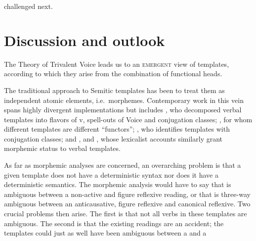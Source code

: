 \begin{exe}
\begin{xlist}
\begin{xlist}
\begin{exe}
\begin{xlist}
\begin{xlist}
\begin{exe}
\begin{xlist}
\begin{xlist}
\begin{exe}
\begin{exe}
\begin{xlist}
\begin{exe}
\begin{exe}
\begin{xlist}
\begin{exe}
\begin{exe}
\begin{exe}
\begin{exe}
\begin{exe}
\begin{xlist}
\begin{exe}
\begin{xlist}
\begin{exe}
\begin{exe}
\begin{xlist}
\begin{exe}
\begin{xlist}
\begin{exe}
\begin{exe}
\begin{exe}
\begin{xlist}
\begin{exe}
\begin{exe}
\begin{exe}
\begin{xlist}
\begin{exe}
\begin{xlist}
\begin{exe}
\begin{xlist}
\begin{exe}
\begin{xlist}
\begin{exe}
\begin{exe}
\begin{exe}
\begin{exe}
\begin{xlist}
\begin{exe}
\begin{xlist}
\begin{exe}
\begin{xlist}
\begin{exe}
\begin{xlist}
\begin{exe}
\begin{xlist}
\begin{exe}
\begin{xlist}
\begin{exe}
\begin{exe}
\begin{exe}
\begin{exe}
\begin{xlist}
\begin{exe}
\begin{xlist}
\begin{exe}
\begin{xlist}
\begin{exe}
\begin{exe}
\begin{xlist}
\begin{exe}
\begin{exe}
\begin{exe}
\begin{exe}
\begin{xlist}
\begin{xlist}
\begin{exe}
\begin{xlist}
\begin{exe}
\begin{exe}
\begin{exe}
\begin{xlist}
\begin{exe}
\begin{exe}
\begin{xlist}
\begin{exe}
\begin{exe}
\begin{exe}
\begin{xlist}
\begin{xlist}
\begin{exe}
\begin{xlist}
\begin{exe}
\begin{exe}
\begin{exe}
\begin{exe}
\begin{xlist}
\begin{exe}
\begin{xlist}
\begin{exe}
\begin{xlist}
\begin{exe}
\begin{exe}
\begin{exe}
\begin{exe}
\begin{exe}
\begin{exe}
\begin{xlist}
\begin{exe}
\begin{xlist}
\begin{exe}
\begin{xlist}
challenged next.


\section{Discussion and outlook} \label{vz:others}
The Theory of Trivalent Voice leads us to an \textsc{emergent} view of templates, according to which they arise from the combination of functional heads.

The traditional approach to Semitic templates has been to treat them as independent atomic elements, i.e.~morphemes. Contemporary work in this vein spans highly divergent implementations but includes \cite{arad03,arad05}, who decomposed verbal templates into flavors of v, spell-outs of Voice and conjugation classes; \cite{borer13oup}, for whom different templates are different ``functors''; \cite{aronoff94,aronoff07}, who identifies templates with conjugation classes; and \cite{reinhartsiloni05}, \cite{schwarzwald08} and \cite{laks11,laks14}, whose lexicalist accounts similarly grant morphemic status to verbal templates.

As far as morphemic analyses are concerned, an overarching problem is that a given template does not have a deterministic syntax nor does it have a deterministic semantics. The morphemic analysis would have to say that {\tnif} is ambiguous between a non-active and figure reflexive reading, or that {\thit} is three-way ambiguous between an anticausative, figure reflexive and canonical reflexive. Two crucial problems then arise. The first is that not all verbs in these templates are ambiguous. The second is that the existing readings are an accident; the templates could just as well have been ambiguous between a  and a 
\end{xlist}
\end{exe}
\end{xlist}
\end{exe}
\end{xlist}
\end{exe}
\end{exe}
\end{exe}
\end{exe}
\end{exe}
\end{exe}
\end{xlist}
\end{exe}
\end{xlist}
\end{exe}
\end{xlist}
\end{exe}
\end{exe}
\end{exe}
\end{exe}
\end{xlist}
\end{exe}
\end{xlist}
\end{xlist}
\end{exe}
\end{exe}
\end{exe}
\end{xlist}
\end{exe}
\end{exe}
\end{xlist}
\end{exe}
\end{exe}
\end{exe}
\end{xlist}
\end{exe}
\end{xlist}
\end{xlist}
\end{exe}
\end{exe}
\end{exe}
\end{exe}
\end{xlist}
\end{exe}
\end{exe}
\end{xlist}
\end{exe}
\end{xlist}
\end{exe}
\end{xlist}
\end{exe}
\end{exe}
\end{exe}
\end{exe}
\end{xlist}
\end{exe}
\end{xlist}
\end{exe}
\end{xlist}
\end{exe}
\end{xlist}
\end{exe}
\end{xlist}
\end{exe}
\end{xlist}
\end{exe}
\end{exe}
\end{exe}
\end{exe}
\end{xlist}
\end{exe}
\end{xlist}
\end{exe}
\end{xlist}
\end{exe}
\end{xlist}
\end{exe}
\end{exe}
\end{exe}
\end{xlist}
\end{exe}
\end{exe}
\end{exe}
\end{xlist}
\end{exe}
\end{xlist}
\end{exe}
\end{exe}
\end{xlist}
\end{exe}
\end{xlist}
\end{exe}
\end{exe}
\end{exe}
\end{exe}
\end{exe}
\end{xlist}
\end{exe}
\end{exe}
\end{xlist}
\end{exe}
\end{exe}
\end{xlist}
\end{xlist}
\end{exe}
\end{xlist}
\end{xlist}
\end{exe}
\end{xlist}
\end{xlist}
\end{exe}
